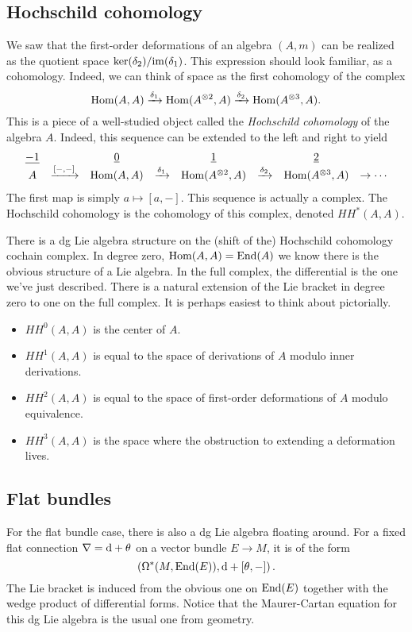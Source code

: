 \documentclass[11pt]{amsart}
\begin{document}
\subsection{Hochschild cohomology}
We saw that the first-order deformations of an algebra $(A, m)$ can be realized as the quotient space $\ker(\delta_2) / {\rm im}(\delta_1)$. 
This expression should look familiar, as a cohomology. 
Indeed, we can think of space as the first cohomology of the complex
\[
{\rm Hom}(A, A) \xrightarrow{\delta_1} {\rm Hom}(A^{\otimes 2}, A) \xrightarrow{\delta_2} {\rm Hom} (A^{\otimes 3}, A) .
\] 
This is a piece of a well-studied object called the {\em Hochschild cohomology} of the algebra $A$. 
Indeed, this sequence can be extended to the left and right to yield
\[
\begin{array}{ccccccccccc}
& \underline{-1} & & \underline{0} & & \underline{1} & & \underline{2} & & \\
& A & \xrightarrow{[-,-]} & {\rm Hom}(A, A) & \xrightarrow{\delta_1} & {\rm Hom}(A^{\otimes 2}, A) & \xrightarrow{\delta_2} & {\rm Hom} (A^{\otimes 3}, A) & \to \cdots
\end{array}
\]
The first map is simply $a \mapsto [a,-]$. 
This sequence is actually a complex.
The Hochschild cohomology is the cohomology of this complex, denoted $HH^*(A, A)$. 

There is a dg Lie algebra structure on the (shift of the) Hochschild cohomology cochain complex. 
In degree zero, ${\rm Hom}(A,A) = {\rm End}(A)$ we know there is the obvious structure of a Lie algebra.
In the full complex, the differential is the one we've just described.
There is a natural extension of the Lie bracket in degree zero to one on the full complex.
It is perhaps easiest to think about pictorially. 

\begin{itemize}
\item $HH^0(A,A)$ is the center of $A$.
\item $HH^1(A,A)$ is equal to the space of derivations of $A$ modulo inner derivations. 
\item $HH^2(A,A)$ is equal to the space of first-order deformations of $A$ modulo equivalence.
\item $HH^3(A,A)$ is the space where the obstruction to extending a deformation lives.
\end{itemize}

\subsection{Flat bundles}

For the flat bundle case, there is also a dg Lie algebra floating around. 
For a fixed flat connection $\nabla = {\rm d} + \theta$ on a vector bundle $E \to M$, it is of the form
\[
\left(\Omega^{*}(M, {\rm End}(E)), {\rm d} + [\theta,-]\right) .
\]
The Lie bracket is induced from the obvious one on ${\rm End}(E)$ together with the wedge product of differential forms.
Notice that the Maurer-Cartan equation for this dg Lie algebra is the usual one from geometry. 
\end{document}
